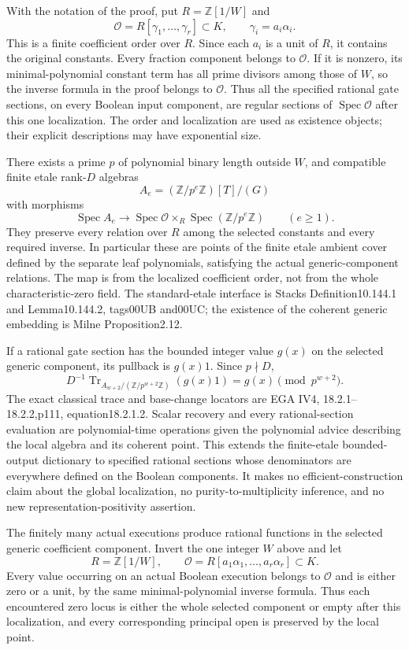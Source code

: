 \begin{geometricstatement}[NN-C044]
With the notation of the proof, put $R=\mathbb Z[1/W]$ and
\[
 \mathcal O=R[\gamma_1,\ldots,\gamma_r]\subset K,
 \qquad \gamma_i=a_i\alpha_i.
\]
This is a finite coefficient order over $R$. Since each $a_i$ is a unit
of $R$, it contains the original constants. Every fraction component
belongs to $\mathcal O$. If it is nonzero, its minimal-polynomial
constant term has all prime divisors among those of $W$, so the inverse
formula in the proof belongs to $\mathcal O$. Thus all the specified
rational gate sections, on every Boolean input component, are regular
sections of $\operatorname{Spec}\mathcal O$ after this one localization.
The order and localization are used as existence objects; their explicit
descriptions may have exponential size.

There exists a prime $p$ of polynomial binary length outside $W$, and
compatible finite etale rank-$D$ algebras
\[
                  A_e=(\mathbb Z/p^e\mathbb Z)[T]/(G)
\]
with morphisms
\[
 \operatorname{Spec}A_e\longrightarrow
       \operatorname{Spec}\mathcal O
                   \times_R\operatorname{Spec}(\mathbb Z/p^e\mathbb Z)
 \qquad(e\ge1).
\]
They preserve every relation over $R$ among the selected constants and
every required inverse. In particular these are points of the finite
etale ambient cover defined by the separate leaf polynomials, satisfying
the actual generic-component relations. The map is from the localized
coefficient order, not from the whole characteristic-zero field.
The standard-etale interface is Stacks Definition10.144.1 and
Lemma10.144.2, tags00UB and00UC; the existence of the coherent generic
embedding is Milne Proposition2.12.

If a rational gate section has the bounded integer value $g(x)$ on the
selected generic component, its pullback is $g(x)1$. Since $p\nmid D$,
\[
 D^{-1}\operatorname{Tr}_{A_{w+2}/(\mathbb Z/p^{w+2}\mathbb Z)}
                      (g(x)1)=g(x)\pmod{p^{w+2}}.
\]
The exact classical trace and base-change locators are EGA IV4,
18.2.1--18.2.2,p111, equation18.2.1.2. Scalar recovery and every
rational-section evaluation are polynomial-time operations given the
polynomial advice describing the local algebra and its coherent point.
This extends the finite-etale bounded-output dictionary to specified
rational sections whose denominators are everywhere defined on the
Boolean components. It makes no efficient-construction claim about the
global localization, no purity-to-multiplicity inference, and no new
representation-positivity assertion.

The finitely many actual executions produce rational functions in the
selected generic coefficient component. Invert the one integer $W$
above and let
\[
 R=\mathbb Z[1/W],\qquad
 \mathcal O=R[a_1\alpha_1,\ldots,a_r\alpha_r]\subset K.
\]
Every value occurring on an actual Boolean execution belongs to
$\mathcal O$ and is either zero or a unit, by the same minimal-polynomial
inverse formula. Thus each encountered zero locus is either the whole
selected component or empty after this localization, and every
corresponding principal open is preserved by the local point.


\end{geometricstatement}
